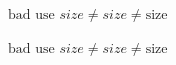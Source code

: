 \documentclass{article}
\begin{document}
$\text{bad use } size \neq \mathit{size} \neq \mathrm{size}$

\textit{$\text{bad use } size \neq \mathit{size} \neq \mathrm{size} $}
\end{document}
